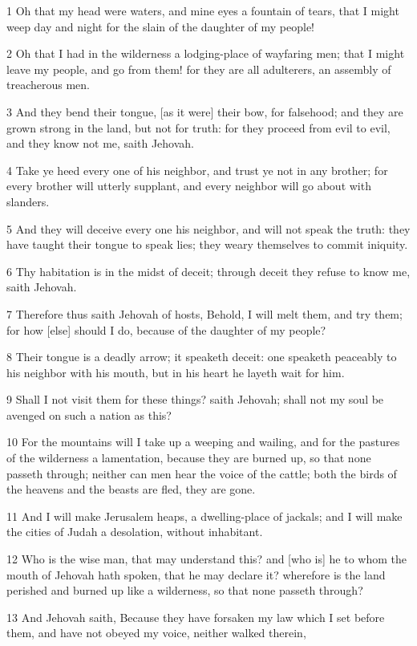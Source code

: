 \par 1 Oh that my head were waters, and mine eyes a fountain of tears, that I might weep day and night for the slain of the daughter of my people!
\par 2 Oh that I had in the wilderness a lodging-place of wayfaring men; that I might leave my people, and go from them! for they are all adulterers, an assembly of treacherous men.
\par 3 And they bend their tongue, [as it were] their bow, for falsehood; and they are grown strong in the land, but not for truth: for they proceed from evil to evil, and they know not me, saith Jehovah.
\par 4 Take ye heed every one of his neighbor, and trust ye not in any brother; for every brother will utterly supplant, and every neighbor will go about with slanders.
\par 5 And they will deceive every one his neighbor, and will not speak the truth: they have taught their tongue to speak lies; they weary themselves to commit iniquity.
\par 6 Thy habitation is in the midst of deceit; through deceit they refuse to know me, saith Jehovah.
\par 7 Therefore thus saith Jehovah of hosts, Behold, I will melt them, and try them; for how [else] should I do, because of the daughter of my people?
\par 8 Their tongue is a deadly arrow; it speaketh deceit: one speaketh peaceably to his neighbor with his mouth, but in his heart he layeth wait for him.
\par 9 Shall I not visit them for these things? saith Jehovah; shall not my soul be avenged on such a nation as this?
\par 10 For the mountains will I take up a weeping and wailing, and for the pastures of the wilderness a lamentation, because they are burned up, so that none passeth through; neither can men hear the voice of the cattle; both the birds of the heavens and the beasts are fled, they are gone.
\par 11 And I will make Jerusalem heaps, a dwelling-place of jackals; and I will make the cities of Judah a desolation, without inhabitant.
\par 12 Who is the wise man, that may understand this? and [who is] he to whom the mouth of Jehovah hath spoken, that he may declare it? wherefore is the land perished and burned up like a wilderness, so that none passeth through?
\par 13 And Jehovah saith, Because they have forsaken my law which I set before them, and have not obeyed my voice, neither walked therein,
